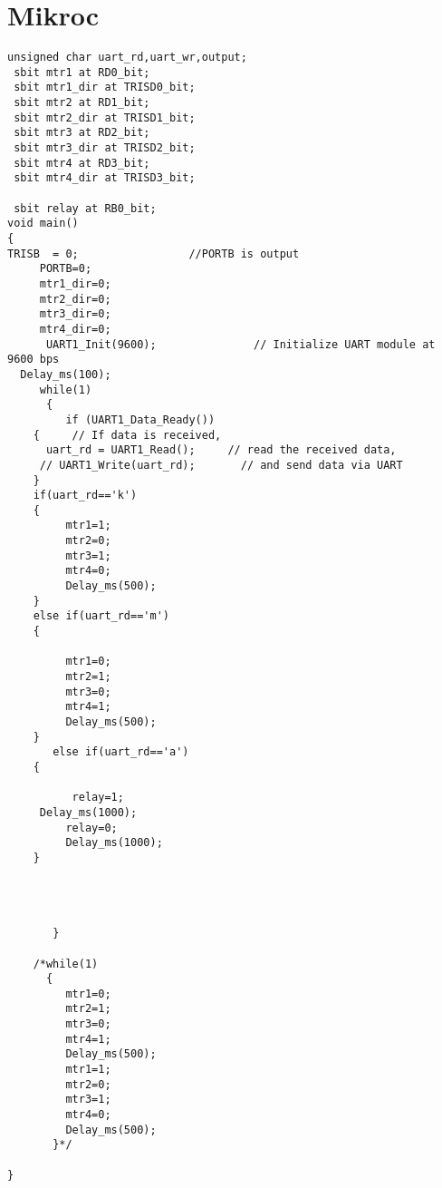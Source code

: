 \documentclass[12pt,a4paper]{report}
\begin{document}
\section{Mikroc}
\begin{lstlisting}
unsigned char uart_rd,uart_wr,output;
 sbit mtr1 at RD0_bit;
 sbit mtr1_dir at TRISD0_bit;
 sbit mtr2 at RD1_bit;
 sbit mtr2_dir at TRISD1_bit;
 sbit mtr3 at RD2_bit;
 sbit mtr3_dir at TRISD2_bit;
 sbit mtr4 at RD3_bit;
 sbit mtr4_dir at TRISD3_bit;

 sbit relay at RB0_bit;
void main()
{
TRISB  = 0;                 //PORTB is output
     PORTB=0;
     mtr1_dir=0;
     mtr2_dir=0;
     mtr3_dir=0;
     mtr4_dir=0;
      UART1_Init(9600);               // Initialize UART module at 9600 bps
  Delay_ms(100);
     while(1)
      {
         if (UART1_Data_Ready())
    {     // If data is received,
      uart_rd = UART1_Read();     // read the received data,
     // UART1_Write(uart_rd);       // and send data via UART
    }
    if(uart_rd=='k')
    {
         mtr1=1;
         mtr2=0;
         mtr3=1;
         mtr4=0;
         Delay_ms(500);
    }
    else if(uart_rd=='m')
    {

         mtr1=0;
         mtr2=1;
         mtr3=0;
         mtr4=1;
         Delay_ms(500);
    }
       else if(uart_rd=='a')
    {

          relay=1;
     Delay_ms(1000);
         relay=0;
         Delay_ms(1000);
    }




       }

    /*while(1)
      {
         mtr1=0;
         mtr2=1;
         mtr3=0;
         mtr4=1;
         Delay_ms(500);
         mtr1=1;
         mtr2=0;
         mtr3=1;
         mtr4=0;
         Delay_ms(500);
       }*/

}


\end{lstlisting}
\end{document}
